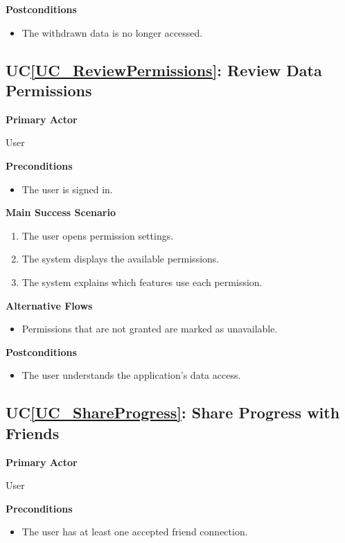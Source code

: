 \documentclass[12pt]{article}
\newcounter{ucnum} %
\newcommand{\ucref}[1]{UC\ref{#1}}
\begin{document}
\textbf{Postconditions}
\begin{itemize}
\item The withdrawn data is no longer accessed.
\end{itemize}


\label{UC_ReviewPermissions}
\subsection{\ucref{UC_ReviewPermissions}: Review Data Permissions}

\textbf{Primary Actor}

User

\textbf{Preconditions}
\begin{itemize}
\item The user is signed in.
\end{itemize}

\textbf{Main Success Scenario}
\begin{enumerate}
\item The user opens permission settings.
\item The system displays the available permissions.
\item The system explains which features use each permission.
\end{enumerate}

\textbf{Alternative Flows}
\begin{itemize}
\item Permissions that are not granted are marked as unavailable.
\end{itemize}

\textbf{Postconditions}
\begin{itemize}
\item The user understands the application's data access.
\end{itemize}


\label{UC_ShareProgress}
\subsection{\ucref{UC_ShareProgress}: Share Progress with Friends}

\textbf{Primary Actor}

User

\textbf{Preconditions}
\begin{itemize}
\item The user has at least one accepted friend connection.
\end{itemize}
\end{document}
